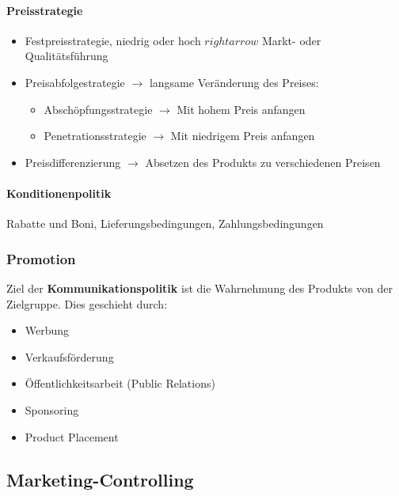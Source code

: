 \documentclass[titlepage,parskip=half]{scrartcl}
\begin{document}
\paragraph{Preisstrategie}
\begin{itemize}
    \item Festpreisstrategie, niedrig oder hoch $rightarrow$ Markt- oder Qualitätsführung
    \item Preisabfolgestrategie $\rightarrow$ langsame Veränderung des Preises:
    \begin{itemize}
        \item Abschöpfungsstrategie $\rightarrow$ Mit hohem Preis anfangen
        \item Penetrationsstrategie $\rightarrow$ Mit niedrigem Preis anfangen
    \end{itemize}
    \item Preisdifferenzierung $\rightarrow$ Absetzen des Produkts zu verschiedenen Preisen
\end{itemize}

\paragraph{Konditionenpolitik}
Rabatte und Boni, Lieferungsbedingungen, Zahlungsbedingungen


\subsubsection{Promotion}
Ziel der \textbf{Kommunikationspolitik} ist die Wahrnehmung des Produkts von der Zielgruppe. Dies geschieht durch:
\begin{itemize}
    \item Werbung
    \item Verkaufsförderung
    \item Öffentlichkeitsarbeit (Public Relations)
    \item Sponsoring
    \item Product Placement
\end{itemize}

\subsection{Marketing-Controlling}
\end{document}
